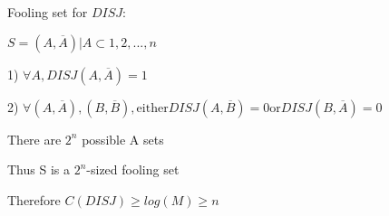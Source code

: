 \documentclass[12pt]{article}
\begin{document}
\par{Fooling set for $DISJ$:}

\par{$S = {(A, \overline{A}) | A \subset {1, 2, ..., n}}$}
\par{\hspace{\parindent} 1) $\forall A, DISJ(A, \overline{A}) = 1$}
\par{\hspace{\parindent} 2) $\forall (A, \overline{A}), (B, \overline{B}), \text{either} DISJ(A, \overline{B}) = 0 \text{or} DISJ(B, \overline{A}) = 0$}
\\
\par{There are $2^{n}$ possible A sets}
\\
\par{Thus S is a $2^{n}$-sized fooling set}
\\
\par{Therefore $C(DISJ) \geq log(M) \geq n$}
\end{document}
